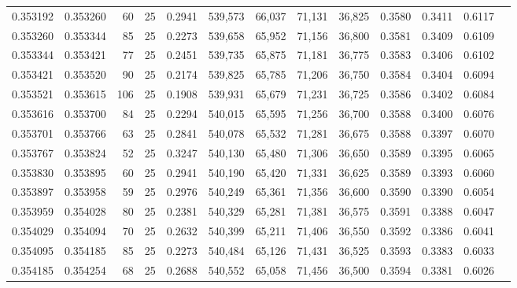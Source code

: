 \begin{tabular}{rrrrrrrrrrrrr}
0.353192 & 0.353260 &    60 &  25 &                                     0.2941 & 539,573 &  66,037 &  71,131 &  36,825 & 0.3580 & 0.3411 & 0.6117 \\
0.353260 & 0.353344 &    85 &  25 &                                     0.2273 & 539,658 &  65,952 &  71,156 &  36,800 & 0.3581 & 0.3409 & 0.6109 \\
0.353344 & 0.353421 &    77 &  25 &                                     0.2451 & 539,735 &  65,875 &  71,181 &  36,775 & 0.3583 & 0.3406 & 0.6102 \\
0.353421 & 0.353520 &    90 &  25 &                                     0.2174 & 539,825 &  65,785 &  71,206 &  36,750 & 0.3584 & 0.3404 & 0.6094 \\
0.353521 & 0.353615 &   106 &  25 &                                     0.1908 & 539,931 &  65,679 &  71,231 &  36,725 & 0.3586 & 0.3402 & 0.6084 \\
0.353616 & 0.353700 &    84 &  25 &                                     0.2294 & 540,015 &  65,595 &  71,256 &  36,700 & 0.3588 & 0.3400 & 0.6076 \\
0.353701 & 0.353766 &    63 &  25 &                                     0.2841 & 540,078 &  65,532 &  71,281 &  36,675 & 0.3588 & 0.3397 & 0.6070 \\
0.353767 & 0.353824 &    52 &  25 &                                     0.3247 & 540,130 &  65,480 &  71,306 &  36,650 & 0.3589 & 0.3395 & 0.6065 \\
0.353830 & 0.353895 &    60 &  25 &                                     0.2941 & 540,190 &  65,420 &  71,331 &  36,625 & 0.3589 & 0.3393 & 0.6060 \\
0.353897 & 0.353958 &    59 &  25 &                                     0.2976 & 540,249 &  65,361 &  71,356 &  36,600 & 0.3590 & 0.3390 & 0.6054 \\
0.353959 & 0.354028 &    80 &  25 &                                     0.2381 & 540,329 &  65,281 &  71,381 &  36,575 & 0.3591 & 0.3388 & 0.6047 \\
0.354029 & 0.354094 &    70 &  25 &                                     0.2632 & 540,399 &  65,211 &  71,406 &  36,550 & 0.3592 & 0.3386 & 0.6041 \\
0.354095 & 0.354185 &    85 &  25 &                                     0.2273 & 540,484 &  65,126 &  71,431 &  36,525 & 0.3593 & 0.3383 & 0.6033 \\
0.354185 & 0.354254 &    68 &  25 &                                     0.2688 & 540,552 &  65,058 &  71,456 &  36,500 & 0.3594 & 0.3381 & 0.6026 \\

\end{tabular}
